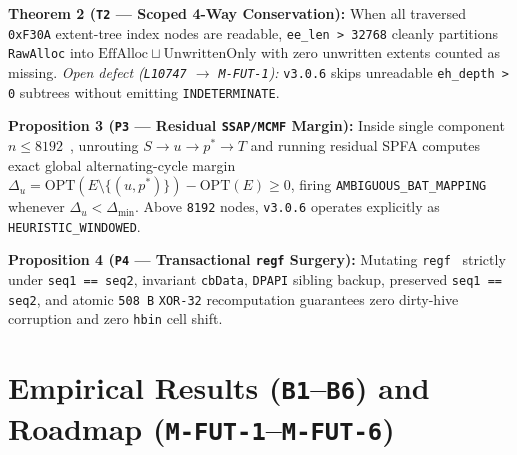 \documentclass[10pt,twocolumn]{article}
\begin{document}
\textbf{Theorem 2 (\texttt{T2} --- Scoped 4-Way Conservation):} When all traversed \texttt{0xF30A} extent-tree index nodes are readable, \texttt{ee\_len > 32768} cleanly partitions \texttt{RawAlloc} into $\mathrm{EffAlloc} \sqcup \mathrm{UnwrittenOnly}$ with zero unwritten extents counted as missing. \emph{Open defect (\texttt{L10747} $\to$ \texttt{M-FUT-1}):} \texttt{v3.0.6} skips unreadable \texttt{eh\_depth > 0} subtrees without emitting \texttt{INDETERMINATE}.

\textbf{Proposition 3 (\texttt{P3} --- Residual \texttt{SSAP/MCMF} Margin):} Inside single component $n \le 8192$~\cite{R04,R05,R06}, unrouting $S \to u \to p^* \to T$ and running residual SPFA computes exact global alternating-cycle margin $\Delta_u = \mathrm{OPT}(E \setminus \{(u,p^*)\}) - \mathrm{OPT}(E) \ge 0$, firing \texttt{AMBIGUOUS\_BAT\_MAPPING} whenever $\Delta_u < \Delta_{\min}$. Above \texttt{8192} nodes, \texttt{v3.0.6} operates explicitly as \texttt{HEURISTIC\_WINDOWED}.

\textbf{Proposition 4 (\texttt{P4} --- Transactional \texttt{regf} Surgery):} Mutating \texttt{regf}~\cite{R25} strictly under \texttt{seq1 == seq2}, invariant \texttt{cbData}, \texttt{DPAPI} sibling backup, preserved \texttt{seq1 == seq2}, and atomic \texttt{508 B} \texttt{XOR-32} recomputation guarantees zero dirty-hive corruption and zero \texttt{hbin} cell shift.

\section{Empirical Results (\texttt{B1}--\texttt{B6}) and Roadmap (\texttt{M-FUT-1}--\texttt{M-FUT-6})}
\end{document}
